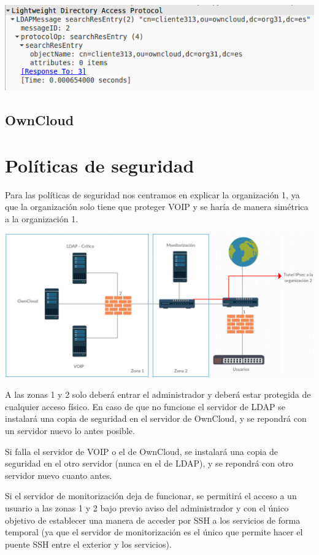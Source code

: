 \documentclass[]{article}
\begin{document}
\begin{center}
	\includegraphics[scale=0.5]{images/ldap/ldap6}
\end{center}


\subsection{OwnCloud}
\section{Políticas de seguridad}
Para las políticas de seguridad nos centramos en explicar la organización 1, ya que la organización solo tiene que proteger VOIP y se haría de manera simétrica a la organización 1.

\begin{center}
	\includegraphics[width=1\linewidth]{images/seguridadorg1}
\end{center}

A las zonas 1 y 2 solo deberá entrar el administrador y deberá estar protegida de cualquier acceso físico. En caso de que no funcione el servidor de LDAP se instalará una copia de seguridad en el servidor de OwnCloud, y se repondrá con un servidor nuevo lo antes posible.

Si falla el servidor de VOIP o el de OwnCloud, se instalará una copia de seguridad en el otro servidor (nunca en el de LDAP), y se repondrá con otro servidor nuevo cuanto antes.

Si el servidor de monitorización deja de funcionar, se permitirá el acceso a un usuario a las zonas 1 y 2 bajo previo aviso del administrador y con el único objetivo de establecer una manera de acceder por SSH a los servicios de forma temporal (ya que el servidor de monitorización es el único que permite hacer el puente SSH entre el exterior y los servicios).
\end{document}
